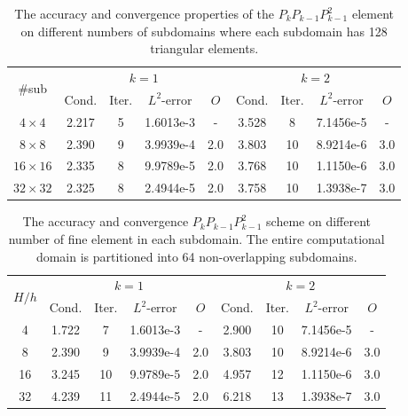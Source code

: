 \begin{table}[H]
	\setlength{\tabcolsep}{2pt} {
		\vspace{-5pt}
		\begin{center}
			\begin{tabular}{c|cccc|cccc}
				\hline
				\multirow{2}{*}{\#sub} &\multicolumn{4}{c|}{$k=1$} &\multicolumn{4}{c}{$k=2$}\\ 
				& Cond.   & Iter. &$L^2$-error & $ O $ & Cond.   & Iter. &$L^2$-error &$ O $ \\
				\hline
				$4\times 4$     &2.217 &5 &1.6013e-3 &-  &3.528 & 8  &7.1456e-5 & - \\
				$8\times 8$     &2.390 &9 &3.9939e-4 & 2.0 &3.803 &10 &8.9214e-6 & 3.0\\
				$16\times 16$ &2.335 &8 &9.9789e-5 & 2.0 &3.768 &10 &1.1150e-6 & 3.0\\
				$32\times 32$ &2.325 &8 &2.4944e-5 & 2.0 &3.758 &10 &1.3938e-7 & 3.0\\
				\hline
			\end{tabular}
		\end{center} }
		\caption{The accuracy and convergence properties of the $P_{k}P_{k-1}P_{k-1}^2$ element on different numbers of subdomains where each subdomain has 128 triangular elements.}
		\label{Tab:case1_PkPk-1Pk-1Row1}
	\end{table}
	
	
	\begin{table}[H]
		\setlength{\tabcolsep}{2pt} {
			\vspace{-5pt}
			\begin{center}
				\begin{tabular}{c|cccc|cccc}
					\hline
					\multirow{2}{*}{$ H/h $} &\multicolumn{4}{c|}{$k=1$}  &\multicolumn{4}{c}{$k=2$}\\ 
					& Cond.   & Iter. &$L^2$-error & $ O $ & Cond.   & Iter. &$L^2$-error &$ O $ \\
					\hline
					4   &1.722 &7   &1.6013e-3 & - &2.900 &10 &7.1456e-5 & - \\
					8   &2.390 &9   &3.9939e-4& 2.0 &3.803 &10 &8.9214e-6 & 3.0\\
					16 &3.245 &10 &9.9789e-5 & 2.0 &4.957 &12 &1.1150e-6 & 3.0\\
					32 &4.239 &11 &2.4944e-5 & 2.0 &6.218 &13 &1.3938e-7 & 3.0\\
					\hline
				\end{tabular}
			\end{center} }
			\caption{The accuracy and convergence  $P_{k}P_{k-1}P_{k-1}^2$ scheme on different number of fine element in each subdomain. The entire computational domain is partitioned into 64 non-overlapping subdomains.}
			\label{Tab:case1_PkPk-1Pk-1Row2}
		\end{table}
		

